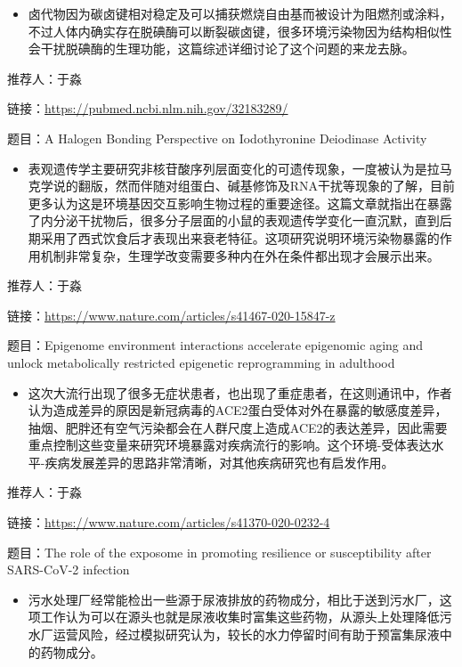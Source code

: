\documentclass[]{book}
\providecommand{\tightlist}{%
  \setlength{\itemsep}{0pt}\setlength{\parskip}{0pt}}
\begin{document}
\begin{itemize}
\tightlist
\item
  卤代物因为碳卤键相对稳定及可以捕获燃烧自由基而被设计为阻燃剂或涂料，不过人体内确实存在脱碘酶可以断裂碳卤键，很多环境污染物因为结构相似性会干扰脱碘酶的生理功能，这篇综述详细讨论了这个问题的来龙去脉。
\end{itemize}

推荐人：于淼

链接：\url{https://pubmed.ncbi.nlm.nih.gov/32183289/}

题目：A Halogen Bonding Perspective on Iodothyronine Deiodinase Activity

\begin{itemize}
\tightlist
\item
  表观遗传学主要研究非核苷酸序列层面变化的可遗传现象，一度被认为是拉马克学说的翻版，然而伴随对组蛋白、碱基修饰及RNA干扰等现象的了解，目前更多认为这是环境基因交互影响生物过程的重要途径。这篇文章就指出在暴露了内分泌干扰物后，很多分子层面的小鼠的表观遗传学变化一直沉默，直到后期采用了西式饮食后才表现出来衰老特征。这项研究说明环境污染物暴露的作用机制非常复杂，生理学改变需要多种内在外在条件都出现才会展示出来。
\end{itemize}

推荐人：于淼

链接：\url{https://www.nature.com/articles/s41467-020-15847-z}

题目：Epigenome environment interactions accelerate epigenomic aging and unlock metabolically restricted epigenetic reprogramming in adulthood

\begin{itemize}
\tightlist
\item
  这次大流行出现了很多无症状患者，也出现了重症患者，在这则通讯中，作者认为造成差异的原因是新冠病毒的ACE2蛋白受体对外在暴露的敏感度差异，抽烟、肥胖还有空气污染都会在人群尺度上造成ACE2的表达差异，因此需要重点控制这些变量来研究环境暴露对疾病流行的影响。这个环境-受体表达水平-疾病发展差异的思路非常清晰，对其他疾病研究也有启发作用。
\end{itemize}

推荐人：于淼

链接：\url{https://www.nature.com/articles/s41370-020-0232-4}

题目：The role of the exposome in promoting resilience or susceptibility after SARS-CoV-2 infection

\begin{itemize}
\tightlist
\item
  污水处理厂经常能检出一些源于尿液排放的药物成分，相比于送到污水厂，这项工作认为可以在源头也就是尿液收集时富集这些药物，从源头上处理降低污水厂运营风险，经过模拟研究认为，较长的水力停留时间有助于预富集尿液中的药物成分。
\end{itemize}
\end{document}
